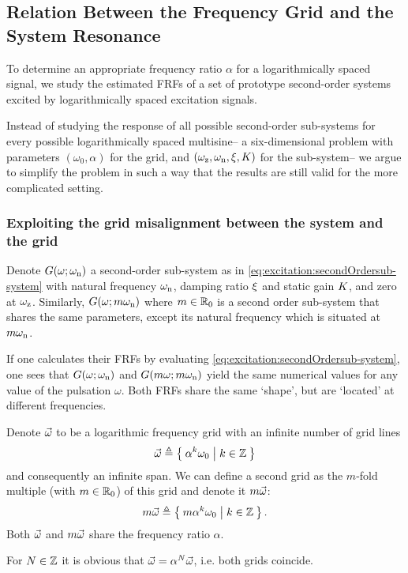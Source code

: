   \subsection{Relation Between the Frequency Grid and the System Resonance} 
  \label{sec:excitation:relationLogGridSystem}
  To determine an appropriate frequency ratio $\alpha$ for a logarithmically spaced signal, we study the estimated \glspl{FRF} of a set of prototype second-order systems excited by logarithmically spaced excitation signals.

  Instead of studying the response of all possible second-order sub-systems for every possible logarithmically spaced multisine-- a six-dimensional problem with parameters $(\omega_0, \alpha)$ for the grid, and $(\omega_{\mathrm{z}}, \omega_{\mathrm{n}}, \xi_{}, K_{})$ for the sub-system-- we argue to simplify the problem in such a way that the results are still valid for the more complicated setting.

  \subsubsection[Exploiting the grid misalignment]{Exploiting the grid misalignment between the system and the grid}
  Denote $G(\omega; \omega_{\mathrm{n}})$ a second-order sub-system as in \eqref{eq:excitation:secondOrdersub-system} with natural frequency $\omega_{\mathrm{n}}$, damping ratio $\xi_{}$ and static gain $K_{}$, and zero at $\omega_{\mathrm{z}}$.
  Similarly, $G(\omega; m\omega_{\mathrm{n}})$ where $m \in {\ensuremath{\mathbb{R}}}_{0}$ is a second order sub-system that shares the same parameters, except its natural frequency which is situated at $m\omega_{\mathrm{n}}$.

  If one calculates their \glspl{FRF} by evaluating \eqref{eq:excitation:secondOrdersub-system}, one sees that $G(\omega; \omega_{\mathrm{n}})$ and $G(m\omega; m\omega_{\mathrm{n}})$ yield the same numerical values for any value of the pulsation $\omega$.
  Both \glspl{FRF} share the same `shape', but are `located' at different frequencies.

  Denote $\vec{\omega}$ to be a logarithmic frequency grid with an infinite number of grid lines
  \begin{equation}
    \vec{\omega} \triangleq \Set{\alpha^k \omega_0 | k \in \ensuremath{\mathbb{Z}}}
    \label{eq:excitation:freqGridLog}
  \end{equation}
  and consequently an infinite span.
  We can define a second grid as the $m$-fold multiple (with $m \in {\ensuremath{\mathbb{R}}}_{0}$) of this grid and denote it $m\vec{\omega}$:
  \begin{equation}
    m \vec{\omega} \triangleq \Set{m \alpha^k \omega_0 | k \in \ensuremath{\mathbb{Z}}}
    \text{.}
  \end{equation}
  Both $\vec{\omega}$ and $m\vec{\omega}$ share the frequency ratio $\alpha$.
  \begin{remark} \label{rem:excitation:exc:gridscaling}
    For $N \in \mathbb{Z}$ it is obvious that $\vec{\omega} = \alpha^{N} \vec{\omega}$, i.e. both grids coincide.
  \end{remark}

